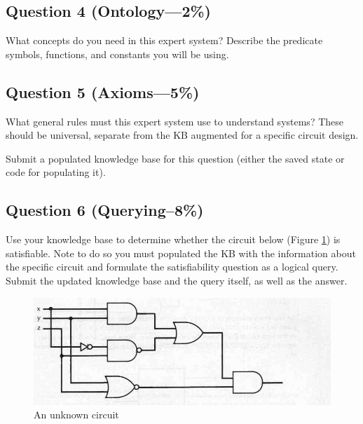 \documentclass[12pt]{article}
\begin{document}
\subsection*{Question 4 \rm(Ontology---2\%)}
What concepts do you need in this expert system? Describe the predicate symbols, functions, and constants you will be using. 

\subsection*{Question 5 \rm(Axioms---5\%)}
What general rules must this expert system use to understand systems? These should be universal, separate from the KB augmented for a specific circuit design.

Submit a populated knowledge base for this question (either the saved state or code for populating it).

\subsection*{Question 6 \rm(Querying--8\%)}
Use your knowledge base to determine whether the circuit below (Figure \ref{fig:sat}) is satisfiable. Note to do so you must populated the KB with the information about the specific circuit and formulate the satisfiability question as a logical query. Submit the updated knowledge base and the query itself, as well as the answer.

\begin{figure}[bt]
\caption{An unknown circuit}
\label{fig:sat}
\centering
\includegraphics[width=.8\textwidth]{circuit2.jpg}
\end{figure}
\end{document}
